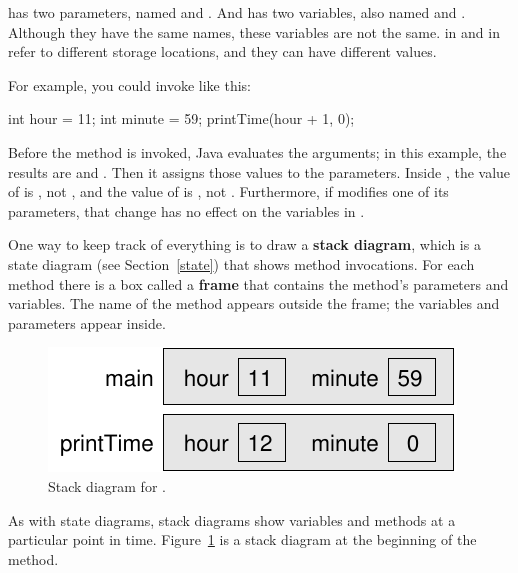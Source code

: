  has two parameters, named  and .
And  has two variables, also named  and .
Although they have the same names, these variables are not the same.
 in  and  in  refer to different storage locations, and they can have different values.

For example, you could invoke  like this:

\begin{code}
int hour = 11;
int minute = 59;
printTime(hour + 1, 0);
\end{code}

Before the method is invoked, Java evaluates the arguments; in this example, the results are  and .
Then it assigns those values to the parameters.
Inside , the value of  is , not , and the value of  is , not .
Furthermore, if  modifies one of its parameters, that change has no effect on the variables in .


One way to keep track of everything is to draw a {\bf stack diagram}, which is a state diagram (see Section~\ref{state}) that shows method invocations.
For each method there is a box called a {\bf frame} that contains the method's parameters and variables.
The name of the method appears outside the frame; the variables and parameters appear inside.

\begin{figure}[!ht]
\begin{center}
\includegraphics[scale=0.9]{figs/stack.pdf}
\caption{Stack diagram for .}
\label{fig.stack}
\end{center}
\end{figure}

As with state diagrams, stack diagrams show variables and methods at a particular point in time.
Figure~\ref{fig.stack} is a stack diagram at the beginning of the  method.

